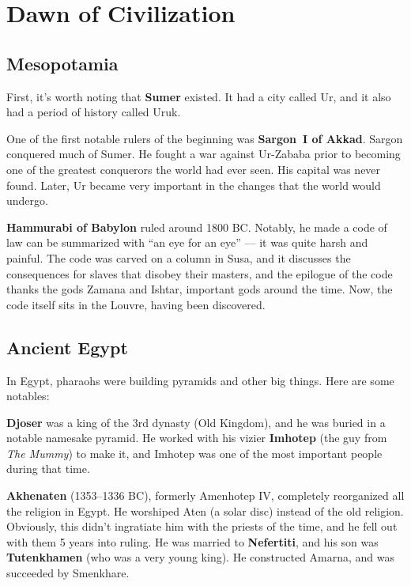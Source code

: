 \chapter{Dawn of Civilization}

\section{Mesopotamia}

First, it's worth noting that \textbf{Sumer} existed.
It had a city called Ur, and it also had a period of history called Uruk.

One of the first notable rulers of the beginning was \textbf{Sargon~I of Akkad}.
Sargon conquered much of Sumer.
He fought a war against Ur-Zababa prior to becoming one of the greatest conquerors the world had ever seen.
His capital was never found.
Later, Ur became very important in the changes that the world would undergo.

\textbf{Hammurabi of Babylon} ruled around 1800 BC\@.
Notably, he made a code of law can be summarized with ``an eye for an eye'' --- it was quite harsh and painful.
The code was carved on a column in Susa,
and it discusses the consequences for slaves that disobey their masters,
and the epilogue of the code thanks the gods Zamana and Ishtar, important gods around the time.
Now, the code itself sits in the Louvre, having been discovered.



\section{Ancient Egypt}

In Egypt, pharaohs were building pyramids and other big things. Here are some notables:

\textbf{Djoser} was a king of the 3rd dynasty (Old Kingdom),
and he was buried in a notable namesake pyramid.
He worked with his vizier \textbf{Imhotep} (the guy from \textit{The Mummy})
to make it, and Imhotep was one of the most important people during that time.

\textbf{Akhenaten} (1353--1336 BC), formerly Amenhotep IV, completely reorganized all the religion in Egypt.
He worshiped Aten (a solar disc) instead of the old religion.
Obviously, this didn't ingratiate him with the priests of the time, and he fell out with them 5 years into ruling.
He was married to \textbf{Nefertiti}, and his son was \textbf{Tutenkhamen} (who was a very young king).
He constructed Amarna, and was succeeded by Smenkhare.

